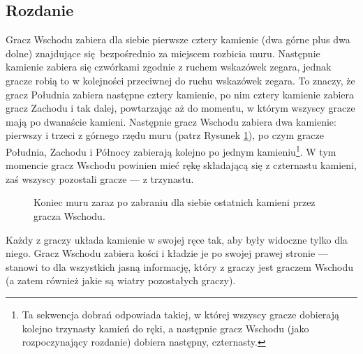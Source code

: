 \subsection{Rozdanie}
Gracz Wschodu zabiera dla siebie pierwsze cztery kamienie (dwa górne plus dwa
dolne) znajdujące się bezpośrednio za miejscem rozbicia muru.
Następnie kamienie zabiera się czwórkami zgodnie z ruchem wskazówek zegara,
jednak gracze robią to w kolejności przeciwnej do ruchu wskazówek zegara.
To znaczy, że gracz Południa zabiera następne cztery kamienie, po nim cztery
kamienie zabiera gracz Zachodu i tak dalej, powtarzając aż do momentu, w którym
wszyscy gracze mają po dwanaście kamieni.
Następnie gracz Wschodu zabiera dwa kamienie: pierwszy i trzeci z górnego rzędu
muru (patrz Rysunek \ref{fig:chinski-szpon}), po czym gracze Południa, Zachodu i
Północy zabierają kolejno po jednym kamieniu\footnote{
    Ta sekwencja dobrań odpowiada takiej, w której wszyscy gracze dobierają
    kolejno trzynasty kamień do ręki, a następnie gracz Wschodu (jako
    rozpoczynający rozdanie) dobiera następny, czternasty.
}.
W tym momencie gracz Wschodu powinien mieć rękę składającą się z czternastu
kamieni, zaś wszyscy pozostali gracze --- z trzynastu.
\begin{figure}[h]
    \centering
    
    \caption{Koniec muru zaraz po zabraniu dla siebie ostatnich kamieni przez gracza
    Wschodu.}
    \label{fig:chinski-szpon}
\end{figure}

Każdy z graczy układa kamienie w swojej ręce tak, aby były widoczne tylko dla
niego.
Gracz Wschodu zabiera kości i kładzie je po swojej prawej stronie --- stanowi to
dla wszystkich jasną informację, który z graczy jest graczem Wschodu (a zatem
również jakie są wiatry pozostałych graczy).